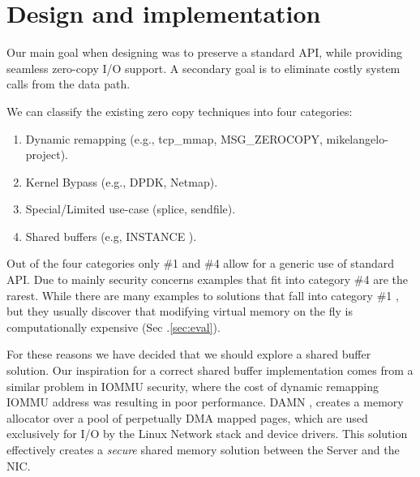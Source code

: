 
\section{Design and implementation}\label{sec:design}
Our main goal when designing \oursys was to preserve a standard \sockets API, while providing seamless zero-copy I/O support. A secondary goal is to eliminate costly system calls from the data path. 

We can classify the existing zero copy techniques into four categories:
\begin{enumerate}
    \item Dynamic remapping (e.g., tcp\_mmap, MSG\_ZEROCOPY\cite{desendmsg}, mikelangelo-project\cite{mikelangelo}).
    \item Kernel Bypass (e.g., DPDK, Netmap\cite{rizzo2012netmap}).
    \item Special/Limited use-case (splice, sendfile).
    \item Shared buffers (e.g, INSTANCE \cite{instance}).
\end{enumerate}
Out of the four categories only \#1 and \#4 allow for a generic use of standard \sockets API. Due to mainly security concerns examples that fit into category \#4 are the rarest.
While there are many examples to solutions that fall into category \#1 \cite{mikelangelo-empty,desendmsg}, but they usually discover that modifying virtual memory on the fly is computationally expensive (Sec .\ref{sec:eval}). 

For these reasons we have decided that we should explore a shared buffer solution. Our inspiration for a correct shared buffer implementation comes from a similar problem in IOMMU security, where the cost of dynamic remapping IOMMU address was resulting in poor performance. DAMN \cite{markuze2018damn}, creates a memory allocator over a pool of perpetually DMA mapped pages, which are used exclusively for I/O by the Linux Network stack and device drivers. This solution effectively creates a \emph{secure} shared memory solution between the Server and the NIC.

